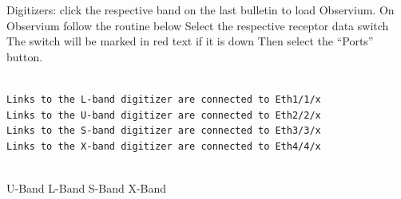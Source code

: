 Digitizers: click the respective band on the last bulletin to load Observium. 
On Observium follow the routine below
Select the respective receptor data switch
The switch will be marked in red text if it is down
Then select the “Ports” button.
\begin{lstlisting}[style=DOS]
 
Links to the L-band digitizer are connected to Eth1/1/x
Links to the U-band digitizer are connected to Eth2/2/x
Links to the S-band digitizer are connected to Eth3/3/x
Links to the X-band digitizer are connected to Eth4/4/x 


\end{lstlisting}
U-Band        L-Band        S-Band        X-Band 


































